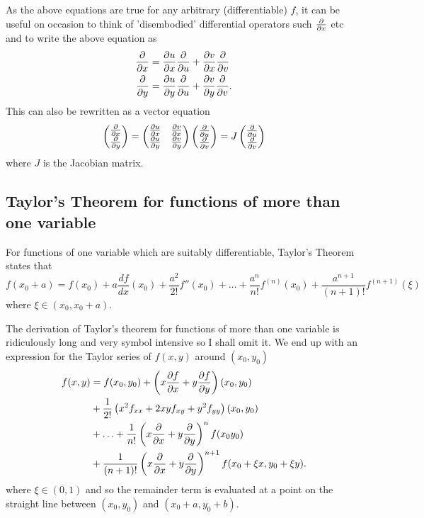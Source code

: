\documentclass[10pt, a4paper]{article}
\begin{document}
As the above equations are true for any arbitrary
(differentiable)
$f$,
it can be useful on occasion to think of 'disembodied' differential operators such $\pd{x}$ etc and to write the above equation as
\begin{align*}
    \pd{x} &= \pd[u]{x}\pd{u} + \pd[v]{x}\pd{v} \\
    \pd{y} &= \pd[u]{y}\pd{u} + \pd[v]{y}\pd{v}.
\end{align*}
This can also be rewritten as a vector equation
\[
\begin{pmatrix}
    \pd{x} \\ \pd{y}
\end{pmatrix} = \begin{pmatrix}
    \pd[u]{x} & \pd[v]{x} \\ \pd[u]{y} & \pd[v]{y}
\end{pmatrix}
\begin{pmatrix}
    \pd{u} \\ \pd{v}
\end{pmatrix}
=
J
\begin{pmatrix}
    \pd{u} \\ \pd{v}
\end{pmatrix}
\]
where $J$ is the Jacobian matrix.

\subsection{Taylor's Theorem for functions of more than one variable}
For functions of one variable which are suitably differentiable,
Taylor's Theorem states that
\[
f(x_0 + a) = f(x_0) + a\frac{df}{dx}(x_0) + \frac{a ^ 2}{2!}f''(x_0) + \dotsc + \frac{a ^ n}{n!}f ^ {(n)}(x_0) + \frac{a ^ {n + 1}}{(n + 1)!}f ^ {(n + 1)}(\xi)
\]
where $\xi \in (x_0, x_0 + a)$.

The derivation of Taylor's theorem for functions of more than one variable is ridiculously long and very symbol intensive so I shall omit it.
We end up with an expression for the Taylor series of $f(x, y)$ around $(x_0, y_0)$
\begin{align*}
    f(x, y) &= f(x_0, y_0) + \left(x\pd[f]{x} + y\pd[f]{y}\right)(x_0, y_0) \\
    &+ \frac{1}{2!}\left(x ^ 2f_{xx} + 2xyf_{xy} + y ^ 2f_{yy}\right)(x_0, y_0) \\
    &+ \dotsc + \frac{1}{n!}\left(x\pd{x} + y\pd{y}\right) ^ nf(x_0 y_0) \\
    &+ \frac{1}{(n + 1)!}\left(x\pd{x} + y\pd{y}\right) ^ {n + 1}f(x_0 + \xi x, y_0 + \xi y).
\end{align*}
where $\xi \in (0, 1)$ and so the remainder term is evaluated at a point on the straight line between $(x_0, y_0)$ and $(x_0 + a, y_0 + b)$.
\end{document}
